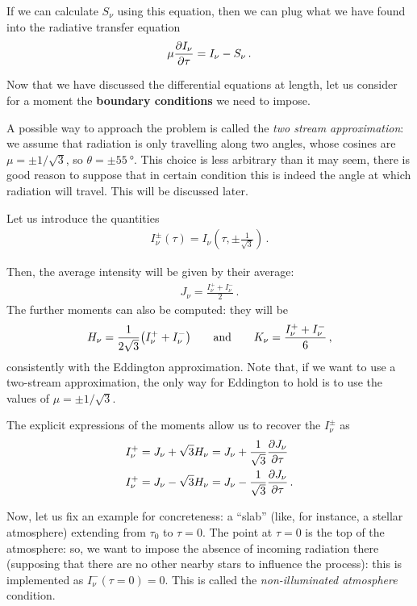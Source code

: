 \documentclass[main.tex]{subfiles}
\begin{document}
If we can calculate \(S_\nu \) using this equation, then we can plug what we have found into the radiative transfer equation 
%
\begin{align}
\mu \pdv{I_\nu }{\tau } = I_\nu - S_\nu 
\,.
\end{align}

Now that we have discussed the differential equations at length, let us consider for a moment the \textbf{boundary conditions} we need to impose. 

A possible way to approach the problem is called the \emph{two stream approximation}: we assume that radiation is only travelling along two angles, whose cosines are \(\mu = \pm 1/ \sqrt{3}\), so \(\theta = \pm \SI{55}{\degree}\). 
This choice is less arbitrary than it may seem, there is good reason to suppose that in certain condition this is indeed the angle at which radiation will travel. This will be discussed later. 

Let us introduce the quantities 
%
\begin{align}
I_\nu^{\pm} (\tau ) = I_\nu (\tau , \pm \frac{1}{\sqrt{3}})
\,.
\end{align}

Then, the average intensity will be given by their average: 
%
\begin{align}
J_\nu = \frac{I_\nu^{+} + I_\nu^{-}}{2}
\,.
\end{align}
%
The further moments can also be computed: they will be 
%
\begin{align}
H_\nu = \frac{1}{2 \sqrt{3}} \qty(I_\nu^{+} + I_\nu^{-})
\qquad \text{and} \qquad
K_\nu = \frac{I_\nu^{+} + I_\nu^{-}}{6}
\,,
\end{align}
%
consistently with the Eddington approximation. Note that, if we want to use a two-stream approximation, the only way for Eddington to hold is to use the values of \(\mu = \pm 1/\sqrt{3}\). 

The explicit expressions of the moments allow us to recover the \(I_\nu^{\pm}\) as 
%
\begin{align}
I_\nu^{+} &= J_\nu + \sqrt{3} H_\nu = J_\nu + \frac{1}{\sqrt{3}} \pdv{J_\nu }{\tau } \\
I_\nu^{+} &= J_\nu - \sqrt{3} H_\nu = J_\nu - \frac{1}{\sqrt{3}} \pdv{J_\nu }{\tau }
\,.
\end{align}

Now, let us fix an example for concreteness: a ``slab'' (like, for instance, a stellar atmosphere) extending from \(\tau_0\) to \(\tau =0\). 
The point at \(\tau = 0\) is the top of the atmosphere: so, we want to impose the absence of incoming radiation there (supposing that there are no other nearby stars to influence the process): this is implemented as \(I_\nu^{-} (\tau = 0) = 0\). 
This is called the \emph{non-illuminated atmosphere} condition. 
\end{document}
